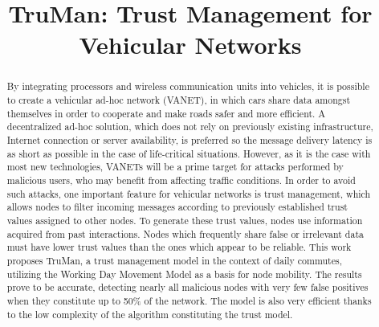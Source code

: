 \documentclass[conference]{IEEEtran}
\begin{document}
\title{TruMan: Trust Management for Vehicular Networks}



\author{
}


\maketitle

\begin{abstract}
By integrating processors and wireless communication units into vehicles, it is possible to create a vehicular ad-hoc network (VANET), in which cars share data amongst themselves in order to cooperate and make roads safer and more efficient.
A decentralized ad-hoc solution, which does not rely on previously existing infrastructure, Internet connection or server availability, is preferred so the message delivery latency is as short as possible in the case of life-critical situations.
However, as it is the case with most new technologies, VANETs will be a prime target for attacks performed by malicious users, who may benefit from affecting traffic conditions.
In order to avoid such attacks, one important feature for vehicular networks is trust management, which allows nodes to filter incoming messages according to previously established trust values assigned to other nodes.
To generate these trust values, nodes use information acquired from past interactions. Nodes which frequently share false or irrelevant data must have lower trust values than the ones which appear to be reliable.
This work proposes TruMan, a trust management model in the context of daily commutes, utilizing the Working Day Movement Model as a basis for node mobility.
The results prove to be accurate, detecting nearly all malicious nodes with very few false positives when they constitute up to 50\% of the network.
The model is also very efficient thanks to the low complexity of the algorithm constituting the trust model.
\end{abstract}
\end{document}
